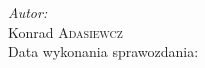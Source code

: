 \begin{titlepage}
\flushright
\Large \emph{Autor:}\\
Konrad \textsc{Adasiewcz}\\[3cm] %

Data wykonania sprawozdania: \\
{\large {}}\\[1cm]


\vfill %

\end{titlepage}
